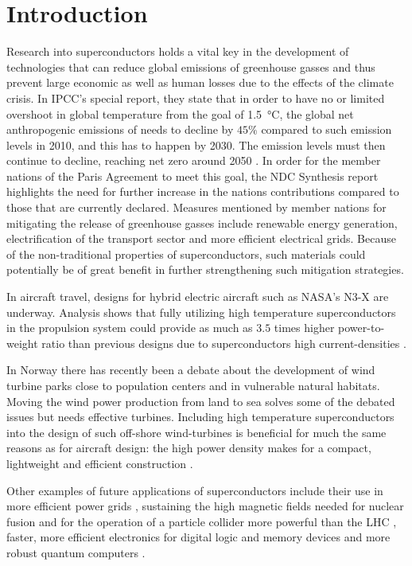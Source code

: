 \chapter{Introduction}\noindent
%
%
Research into superconductors holds a vital key in the development of technologies that can reduce global emissions of greenhouse gasses
and thus prevent large economic as well as human losses due to the effects of the climate crisis.
In IPCC's special report, they state that in order to have no or limited overshoot in global temperature from the goal of \SI{1.5}{\degreeCelsius},
the global net anthropogenic emissions of  needs to decline by $45\%$ compared to such emission levels in 2010, and this has to happen
by 2030. The emission levels must then continue to decline, reaching net zero around 2050 \cite{Allen18}.
In order for the member nations of the Paris Agreement to meet this goal, the NDC Synthesis report \cite{NDC21} highlights the need for further
increase in the nations contributions compared to those that are currently declared. Measures mentioned by member nations for mitigating the
release of greenhouse gasses include renewable energy generation, electrification of the transport sector and more efficient electrical grids.
Because of the non-traditional properties of superconductors, such materials could potentially be of great benefit in further strengthening
such mitigation strategies.

In aircraft travel, designs for hybrid electric aircraft such as NASA's N3-X are underway. Analysis shows that fully utilizing high temperature
superconductors in the propulsion system could provide as much as $3.5$ times higher power-to-weight ratio than previous designs due to
superconductors high current-densities \cite{Corduan20}.

In Norway there has recently been a debate about the development of wind turbine parks close to population centers and in vulnerable natural
habitats. Moving the wind power production from land to sea solves some of the debated issues but needs effective turbines. Including high
temperature superconductors into the design of such off-shore wind-turbines is beneficial for much the same reasons as for aircraft design:
the high power density makes for a compact, lightweight and efficient construction \cite{Cheng21, Liu18}.

Other examples of future applications of superconductors include their use in more efficient power grids \cite{Tixador19, Stemmle14}, sustaining the high
magnetic fields needed for nuclear fusion \cite{Hartwig20, Whyte19} and for the operation of a particle collider more powerful than the
LHC \cite{Mentink18}, faster, more efficient electronics for digital logic and memory devices and more robust quantum computers \cite{Bommer19}.

